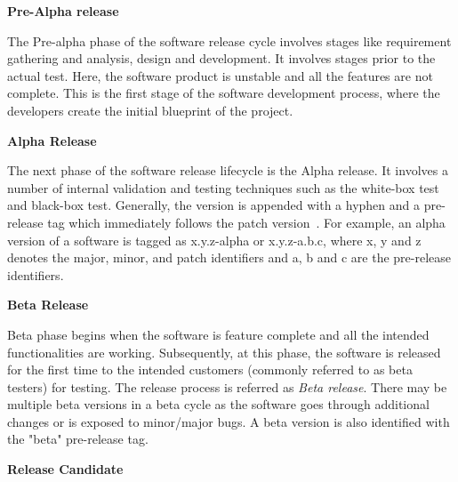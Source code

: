 \noindent \textbf{Pre-Alpha release}
\vspace{0.2cm}

\noindent The Pre-alpha phase of the software release cycle involves stages like requirement gathering and analysis, design and development. It involves stages prior to the actual test. Here, the software product is unstable and all the features are not complete. This is the first stage of the software development process, where the developers create the initial blueprint of the project.


\vspace{0.5cm}
\noindent \textbf{Alpha Release}
\vspace{0.2cm}

\noindent The next phase of the software release lifecycle is the Alpha release. It involves a number of internal validation and testing techniques such as the white-box test and black-box test. Generally, the version is appended with a hyphen and a pre-release tag which immediately follows the patch version~\parencite{preston2013semantic}. For example, an alpha version of a software is tagged as x.y.z-alpha or x.y.z-a.b.c, where x, y and z denotes the major, minor, and patch identifiers and a, b and c are the pre-release identifiers. 

\vspace{0.5cm}
\noindent \textbf{Beta Release}
\vspace{0.2cm}

\noindent Beta phase begins when the software is feature complete and all the intended functionalities are working. Subsequently, at this phase, the software is released for the first time to the intended customers (commonly referred to as beta testers) for testing. The release process is referred as \emph{Beta release}. There may be multiple beta versions in a beta cycle as the software goes through additional changes or is exposed to minor/major bugs. A beta version is also identified with the "beta" pre-release tag.


\vspace{0.5cm}
\noindent \textbf{Release Candidate}
\vspace{0.2cm}


